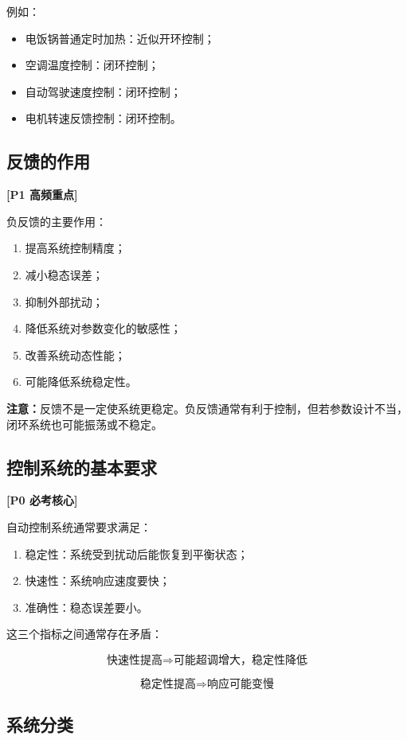 \documentclass[UTF8,a4paper,12pt]{ctexart}
\newcommand{\Pzero}{\textcolor{p0}{\textbf{[P0 必考核心]}}}
\newcommand{\Pone}{\textcolor{p1}{\textbf{[P1 高频重点]}}}
\newcommand{\note}{\textcolor{note}{\textbf{注意：}}}
\begin{document}
例如：
\begin{itemize}
    \item 电饭锅普通定时加热：近似开环控制；
    \item 空调温度控制：闭环控制；
    \item 自动驾驶速度控制：闭环控制；
    \item 电机转速反馈控制：闭环控制。
\end{itemize}

\subsection{反馈的作用}

\Pone

负反馈的主要作用：

\begin{enumerate}
    \item 提高系统控制精度；
    \item 减小稳态误差；
    \item 抑制外部扰动；
    \item 降低系统对参数变化的敏感性；
    \item 改善系统动态性能；
    \item 可能降低系统稳定性。
\end{enumerate}

\note 反馈不是一定使系统更稳定。负反馈通常有利于控制，但若参数设计不当，闭环系统也可能振荡或不稳定。

\subsection{控制系统的基本要求}

\Pzero

自动控制系统通常要求满足：

\begin{enumerate}
    \item 稳定性：系统受到扰动后能恢复到平衡状态；
    \item 快速性：系统响应速度要快；
    \item 准确性：稳态误差要小。
\end{enumerate}

这三个指标之间通常存在矛盾：

\[
\text{快速性提高} \Rightarrow \text{可能超调增大，稳定性降低}
\]

\[
\text{稳定性提高} \Rightarrow \text{响应可能变慢}
\]

\subsection{系统分类}
\end{document}
